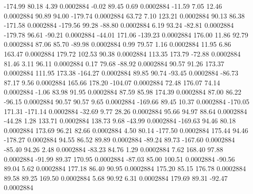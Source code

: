      -174.99       80.18        4.39     0.0002884
       -0.02       89.45        0.69     0.0002884
      -11.59        7.05       12.46     0.0002884
       90.89       94.00     -179.74     0.0002884
       63.72        7.10      123.21     0.0002884
       90.13       86.38     -171.58     0.0002884
     -179.56       99.28      -88.80     0.0002884
        6.19       93.24      -82.81     0.0002884
     -179.78       96.61      -90.21     0.0002884
      -44.01      171.06     -139.23     0.0002884
      176.00       11.86       92.79     0.0002884
       87.06       85.70      -89.98     0.0002884
        0.99       79.57        1.16     0.0002884
       11.95        6.86      163.47     0.0002884
      179.72      102.53       90.38     0.0002884
      113.35      173.79      -72.88     0.0002884
       81.46        3.11       96.11     0.0002884
        0.17       79.68      -88.92     0.0002884
       90.57       91.26      173.37     0.0002884
      111.95      173.38     -164.27     0.0002884
       89.85       90.74      -93.45     0.0002884
      -86.73       87.17        9.56     0.0002884
      165.66      178.20     -104.07     0.0002884
       72.48      176.07       74.14     0.0002884
       -1.06       83.98       91.95     0.0002884
       87.59       85.98      174.39     0.0002884
       87.00       86.22      -96.15     0.0002884
       90.57       90.57        9.65     0.0002884
     -169.66       89.45       10.37     0.0002884
     -170.05      171.31     -171.14     0.0002884
      -32.69        9.77       28.26     0.0002884
       95.66       94.97       88.64     0.0002884
      -44.28        1.28      133.71     0.0002884
      138.73        9.68      -43.99     0.0002884
     -169.63       94.46       80.18     0.0002884
      173.69       96.21       82.66     0.0002884
        4.50       80.14     -177.50     0.0002884
      175.44       94.46     -178.27     0.0002884
       94.55       86.52       89.89     0.0002884
      -89.24       89.73     -167.60     0.0002884
      -85.40       94.26        2.48     0.0002884
      -83.23       84.76        1.29     0.0002884
        7.62      168.40       97.88     0.0002884
      -91.99       89.37      170.95     0.0002884
      -87.03       85.00      100.51     0.0002884
      -90.56       89.04        5.62     0.0002884
      177.18       86.40       90.95     0.0002884
      175.20       85.15      176.78     0.0002884
       89.58       89.25      169.50     0.0002884
        5.68       90.92        6.31     0.0002884
      179.69       89.31      -92.47     0.0002884
